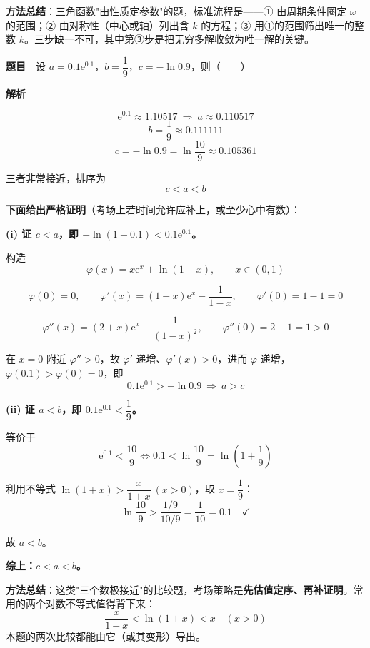 
\begin{gktip}
\textbf{方法总结}：三角函数"由性质定参数"的题，标准流程是——① 由周期条件圈定 $\omega$ 的范围；② 由对称性（中心或轴）列出含 $k$ 的方程；③ 用①的范围筛出唯一的整数 $k$。三步缺一不可，其中第③步是把无穷多解收敛为唯一解的关键。
\end{gktip}

\par\medskip


\textbf{题目}　设 $a=0.1\mathrm e^{0.1}$，$b=\dfrac19$，$c=-\ln0.9$，则（　　）

\textbf{解析}

\[\mathrm e^{0.1}\approx1.10517\ \Longrightarrow\ a\approx0.110517\]
\[b=\frac19\approx0.111111\]
\[c=-\ln0.9=\ln\frac{10}9\approx0.105361\]

三者非常接近，排序为
\[c<a<b\]

\textbf{下面给出严格证明}（考场上若时间允许应补上，或至少心中有数）：

\textbf{(i) 证 $c<a$，即 $-\ln(1-0.1)<0.1\mathrm e^{0.1}$。}

构造
\[\varphi(x)=x\mathrm e^{x}+\ln(1-x),\qquad x\in(0,1)\]

\[\varphi(0)=0,\qquad \varphi'(x)=(1+x)\mathrm e^{x}-\frac1{1-x},\qquad \varphi'(0)=1-1=0\]

\[\varphi''(x)=(2+x)\mathrm e^{x}-\frac1{(1-x)^{2}},\qquad \varphi''(0)=2-1=1>0\]

在 $x=0$ 附近 $\varphi''>0$，故 $\varphi'$ 递增、$\varphi'(x)>0$，进而 $\varphi$ 递增，$\varphi(0.1)>\varphi(0)=0$，即
\[0.1\mathrm e^{0.1}>-\ln0.9\ \Longrightarrow\ a>c\]

\textbf{(ii) 证 $a<b$，即 $0.1\mathrm e^{0.1}<\dfrac19$。}

等价于
\[\mathrm e^{0.1}<\frac{10}9\iff 0.1<\ln\frac{10}9=\ln\left(1+\frac19\right)\]

利用不等式 $\ln(1+x)>\dfrac x{1+x}\ (x>0)$，取 $x=\dfrac19$：
\[\ln\frac{10}9>\frac{1/9}{10/9}=\frac1{10}=0.1\quad\checkmark\]

故 $a<b$。

\textbf{综上：$c<a<b$。}


\begin{gktip}
\textbf{方法总结}：这类"三个数极接近"的比较题，考场策略是\textbf{先估值定序、再补证明}。常用的两个对数不等式值得背下来：
\[\frac{x}{1+x}<\ln(1+x)<x\quad(x>0)\]
本题的两次比较都能由它（或其变形）导出。
\end{gktip}

